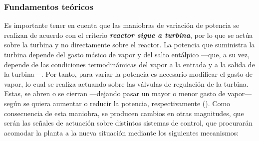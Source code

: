   \subsubsection{Fundamentos teóricos}

  Es importante tener en cuenta que las maniobras de variación de potencia se realizan de acuerdo con el criterio \textit{\textbf{reactor sigue a turbina}}, por lo que se actúa sobre la turbina y no directamente sobre el reactor. La potencia que suministra la turbina depende del gasto másico de vapor y del salto entálpico ---que, a su vez, depende de las condiciones termodinámicas del vapor a la entrada y a la salida de la turbina---. Por tanto, para variar la potencia es necesario modificar el gasto de vapor, lo cual se realiza actuando sobre las válvulas de regulación de la turbina. Estas, se abren o se cierran ---dejando pasar un mayor o menor gasto de vapor--- según se quiera aumentar o reducir la potencia, respectivamente (\cite{apuntes_centrales}). Como consecuencia de esta maniobra, se producen cambios en otras magnitudes, que serán las señales de actuación sobre distintos sistemas de control, que procurarán acomodar la planta a la nueva situación mediante los siguientes mecanismos:

